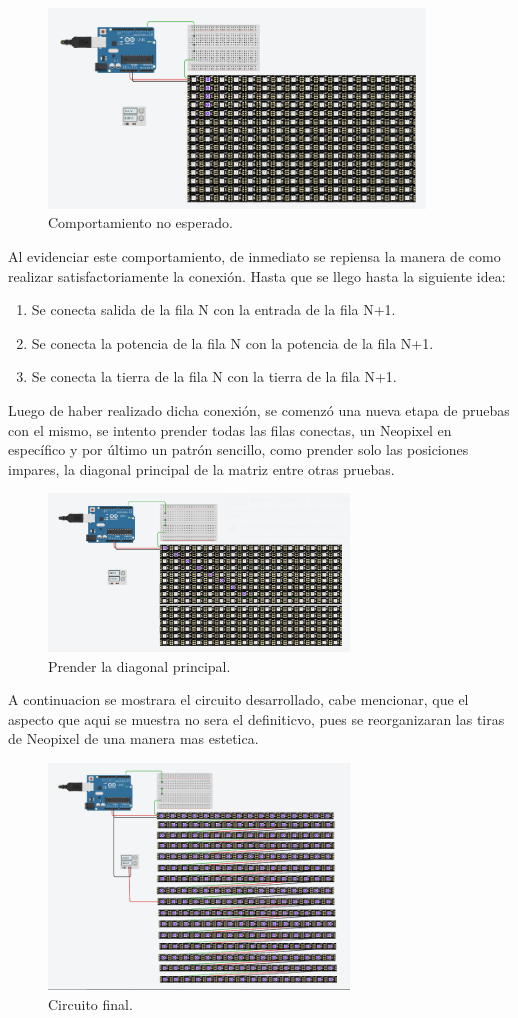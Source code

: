 \documentclass{article}
\begin{document}
\begin{figure}[h]
  \includegraphics[width=10cm]{figura_2.png}
  \centering
  \caption{Comportamiento no esperado.}
  \label{fig:por_columnas}
\end{figure}
Al evidenciar este comportamiento, de inmediato se repiensa la manera de como realizar satisfactoriamente la conexión. Hasta que se llego hasta la siguiente idea:
\begin{enumerate}
    \item Se conecta salida de la fila N con la entrada de la fila N+1.
    \item Se conecta la potencia de la fila N con la potencia de la fila N+1.
    \item Se conecta la tierra de la fila N con la tierra de la fila N+1.
\end{enumerate}
Luego de haber realizado dicha conexión, se comenzó una nueva etapa de pruebas con el mismo, se intento prender todas las filas conectas, un Neopixel en específico y por último un patrón sencillo, como prender solo las posiciones impares, la diagonal principal de la matriz entre otras pruebas.
\begin{figure}[h]
  \centering
  \includegraphics[width=8cm]{figura_3.png}
  \caption{Prender la diagonal principal.}
  \label{fig:diagonal_ppal}
\end{figure}
A continuacion se mostrara el circuito desarrollado, cabe mencionar, que el aspecto que aqui se muestra no sera el definiticvo, pues se reorganizaran las tiras de Neopixel de una manera mas estetica.
\begin{figure}[h]
  \centering
  \includegraphics[width=8cm]{figura_4.png}
  \caption{Circuito final.}
  \label{fig:circuito_final}
\end{figure}
\end{document}
